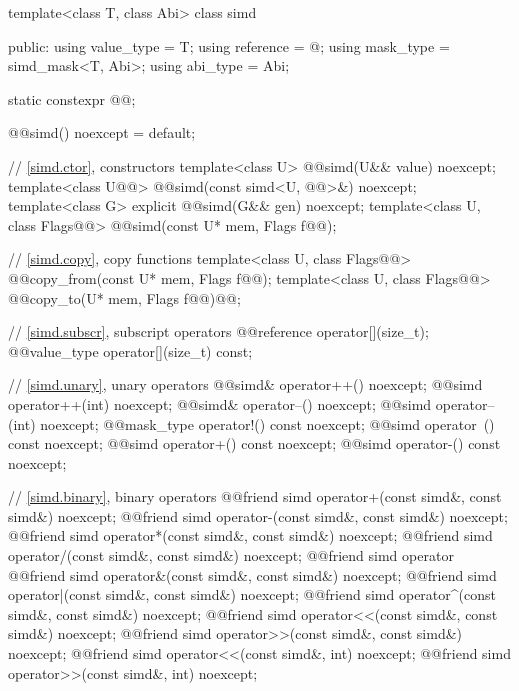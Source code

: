\begin{codeblock}
template<class T, class Abi> class simd {
public:
  using value_type = T;
  using reference = @\seebelow@;
  using mask_type = simd_mask<T, Abi>;
  using abi_type = Abi;

  static constexpr @@;

  @@simd() noexcept = default;

  // \ref{simd.ctor},  constructors
  template<class U> @@simd(U&& value) noexcept;
  template<class U@@> @@simd(const simd<U, @@>&) noexcept;
  template<class G> explicit @@simd(G&& gen) noexcept;
  template<class U, class Flags@@> @@simd(const U* mem, Flags f@\wgAdd{ = \{\}}@);

  // \ref{simd.copy},  copy functions
  template<class U, class Flags@@> @@copy_from(const U* mem, Flags f@\wgAdd{ = \{\}}@);
  template<class U, class Flags@@> @@copy_to(U* mem, Flags f@\wgAdd{ = \{\}}@)@@;

  // \ref{simd.subscr},  subscript operators
  @@reference operator[](size_t);
  @@value_type operator[](size_t) const;

  // \ref{simd.unary},  unary operators
  @@simd& operator++() noexcept;
  @@simd operator++(int) noexcept;
  @@simd& operator--() noexcept;
  @@simd operator--(int) noexcept;
  @@mask_type operator!() const noexcept;
  @@simd operator~() const noexcept;
  @@simd operator+() const noexcept;
  @@simd operator-() const noexcept;

  // \ref{simd.binary},  binary operators
  @@friend simd operator+(const simd&, const simd&) noexcept;
  @@friend simd operator-(const simd&, const simd&) noexcept;
  @@friend simd operator*(const simd&, const simd&) noexcept;
  @@friend simd operator/(const simd&, const simd&) noexcept;
  @@friend simd operator%
  @@friend simd operator&(const simd&, const simd&) noexcept;
  @@friend simd operator|(const simd&, const simd&) noexcept;
  @@friend simd operator^(const simd&, const simd&) noexcept;
  @@friend simd operator<<(const simd&, const simd&) noexcept;
  @@friend simd operator>>(const simd&, const simd&) noexcept;
  @@friend simd operator<<(const simd&, int) noexcept;
  @@friend simd operator>>(const simd&, int) noexcept;

}
\end{codeblock}
